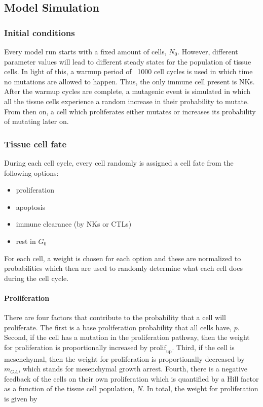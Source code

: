 \documentclass[11pt, a4paper, preprint]{article}
\begin{document}
\subsection{Model Simulation}

\subsubsection{Initial conditions} Every model run starts with a fixed amount of cells, $N_0$.
However, different parameter values will lead to different steady states for the population of tissue cells.
In light of this, a warmup period of ~1000 cell cycles is used in which time no mutations are allowed to happen.
Thus, the only immune cell present is NKs.
After the warmup cycles are complete, a mutagenic event is simulated in which all the tissue cells experience a random increase in their probability to mutate.
From then on, a cell which proliferates either mutates or increases its probability of mutating later on.

\subsubsection{Tissue cell fate}
During each cell cycle, every cell randomly is assigned a cell fate from the following options:
\begin{itemize}
\item proliferation
\item apoptosis
\item immune clearance (by NKs or CTLs)
\item rest in $G_0$
\end{itemize}

For each cell, a weight is chosen for each option and these are normalized to probabilities which then are used to randomly determine what each cell does during the cell cycle.

\paragraph{Proliferation}
There are four factors that contribute to the probability that a cell will proliferate.
The first is a base proliferation probability that all cells have, $p$.
Second, if the cell has a mutation in the proliferation pathway, then the weight for proliferation is proportionally increased by $\text{prolif}_{\text{up}}$.
Third, if the cell is mesenchymal, then the weight for proliferation is proportionally decreased by $m_{GA}$, which stands for mesenchymal growth arrest.
Fourth, there is a negative feedback of the cells on their own proliferation which is quantified by a Hill factor as a function of the tissue cell population, $N$.
In total, the weight for proliferation is given by
\end{document}
